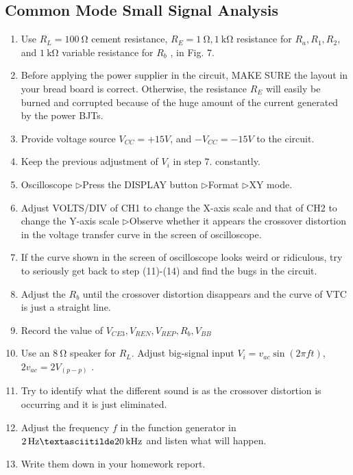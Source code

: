 \documentclass[12pt, a4paper]{article}
\newcommand{\tri}{$\rhd$}
\begin{document}
\subsection{Common Mode Small Signal Analysis}
\begin{enumerate}[itemsep=0pt]
  \item Use $R_L = \SI{100}\ohm$ cement resistance, $R_E = \SI{1}\ohm, \SI{1}\kohm$ resistance for
    $R_a , R_1 , R_2$, and $\SI{1}\kohm$ variable resistance for $R_b$ , in Fig. 7.
\item  Before applying the power supplier in the circuit, MAKE SURE the
layout in your bread board is correct. Otherwise, the resistance $R_E$ will
easily be burned and corrupted because of the huge amount of the current
generated by the power BJTs.
\item  Provide voltage source $V_{CC} = +15V$, and $−V_{CC} = −15V$ to the circuit.
\item  Keep the previous adjustment of $V_i$ in step 7. constantly.
\item  Oscilloscope  \tri  Press the DISPLAY button  \tri  Format  \tri  XY mode.
\item  Adjust VOLTS/DIV of CH1 to change the X-axis scale and that of CH2
to change the Y-axis scale  \tri  Observe whether it appears the crossover
distortion in the voltage transfer curve in the screen of oscilloscope.
\item  If the curve shown in the screen of oscilloscope looks weird or ridiculous,
try to seriously get back to step (11)-(14) and find the bugs in the circuit.
\item  Adjust the $R_b$ until the crossover distortion disappears and the curve of
VTC is just a straight line.
\item  Record the value of $V_{CE3}, V_{REN}, V_{REP}, R_b, V_{BB}$
\item  Use an $\SI{8}\ohm$ speaker for $R_L$. Adjust big-signal input $V_i = v_{ac} \sin(2\pi ft)$, 
  $2v_{ac} = 2V_{(p-p)}$ .
\item  Try to identify what the different sound is as the crossover distortion is
occurring and it is just eliminated.
\item  Adjust the frequency $f$ in the function generator in $\SI{2}{\Hz} \textasciitilde \SI{20}{kHz}$ and listen
what will happen.
\item  Write them down in your homework report.
\end{enumerate}
\end{document}
